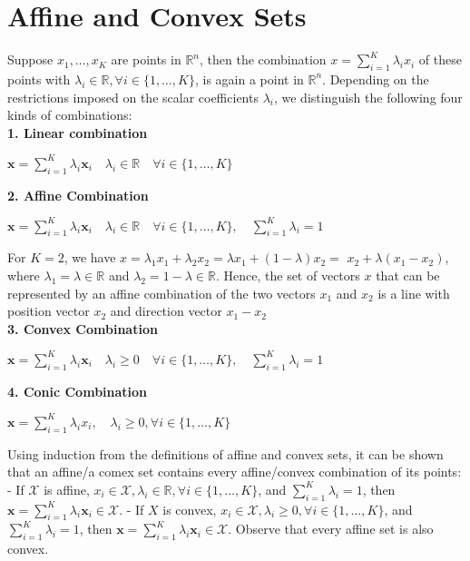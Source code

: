 \documentclass[english]{latex4ei_sheet}
\begin{document}
\section{Affine and Convex Sets}

\begin{sectionbox}
Suppose $x_{1}, \ldots, x_{K}$ are points in $\mathbb{R}^{n}$, then the combination $x=\sum_{i=1}^{K} \lambda_{i} x_{i}$ of these points with $\lambda_{i} \in \mathbb{R}, \forall i \in\{1, \ldots, K\}$, is again a point in $\mathbb{R}^{n}$. Depending on the restrictions imposed on the scalar coefficients $\lambda_{i}$, we distinguish the following four kinds of combinations:\\
\textbf{1. Linear combination}
\begin{emphbox}
$\mathbf{x} = \sum_{i=1}^{K} \lambda_i \mathbf{x}_i \quad \lambda_i \in \mathbb{R} \quad \forall i\in\{1,\dots,K\}$\\
\end{emphbox}
\textbf{2. Affine Combination}
\begin{emphbox}
$\mathbf{x} = \sum_{i=1}^{K} \lambda_i \mathbf{x}_i \quad \lambda_i \in \mathbb{R} \quad \forall i\in\{1,\dots,K\}, \quad \sum_{i=1}^K \lambda_i = 1$\\
\end{emphbox}
For $K=2$, we have $x=\lambda_{1} x_{1}+\lambda_{2} x_{2}=\lambda x_{1}+(1-\lambda) x_{2}=$ $x_{2}+\lambda\left(x_{1}-x_{2}\right)$, where $\lambda_{1}=\lambda \in \mathbb{R}$ and $\lambda_{2}=1-\lambda \in \mathbb{R}$. Hence, the set of vectors $x$ that can be represented by an affine combination of the two vectors $x_{1}$ and $x_{2}$ is a line with position vector $x_{2}$ and direction vector $x_{1}-x_{2}$\\
\textbf{3. Convex Combination}
\begin{emphbox}
$\mathbf{x} = \sum_{i=1}^{K} \lambda_i \mathbf{x}_i \quad \lambda_i \geq 0 \quad \forall i\in\{1,\dots,K\}, \quad \sum_{i=1}^K \lambda_i = 1$\\
\end{emphbox}
\textbf{4. Conic Combination}
\begin{emphbox}
$\mathbf{x}=\sum_{i=1}^{K} \lambda_{i}{x}_{i}, \quad \lambda_{i} \geq 0, \forall i \in\{1, \ldots, K\}$
\end{emphbox}
Using induction from the definitions of affine and convex sets, it can be shown that an affine/a comex set contains every affine/convex combination of its points:
- If $\mathcal{X}$ is affine, $x_{i} \in \mathcal{X}, \lambda_{i} \in \mathbb{R}, \forall i \in\{1, \ldots, K\}$, and $\sum_{i=1}^{K} \lambda_{i}=1$, then $\boldsymbol{x}=\sum_{i=1}^{K} \lambda_{i} \boldsymbol{x}_{i} \in \mathcal{X} .$
- If $X$ is convex, $x_{i} \in \mathcal{X}, \lambda_{i} \geq 0, \forall i \in\{1, \ldots, K\}$, and $\sum_{i=1}^{K} \lambda_{i}=1$, then $\boldsymbol{x}=\sum_{i=1}^{K} \lambda_{i} \boldsymbol{x}_{i} \in \mathcal{X} .$
Observe that every affine set is also convex.

\end{sectionbox}
\end{document}

